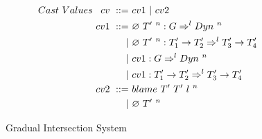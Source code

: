 \documentclass[a4paper]{article}
\begin{document}
\begin{figure}[H]
\begin{align*}
&Cast\ Values\ \begin{aligned}[t] cv\ ::=&\ cv1\ |\ cv2\\
                                cv1\ ::=&\ \emptycast{T'}{n} : G \Rightarrow^l \Dyn\ ^n\\
                                       |&\ \emptycast{T'}{n} : T'_1 \rightarrow T'_2 \Rightarrow^l T'_3 \rightarrow T'_4\\
                                       |&\ cv1 : G \Rightarrow^l \Dyn\ ^n\\
                                       |&\ cv1 : T'_1 \rightarrow T'_2 \Rightarrow^l T'_3 \rightarrow T'_4\\
                                cv2\ ::=&\ \blamecast{T'}{T'}{l}{n}\\
                                       |&\ \emptycast{T'}{n} \end{aligned}
\end{align*}

\hrulefill
\caption{Gradual Intersection System}
\label{intersection_syntax}
\end{figure}
\end{document}

